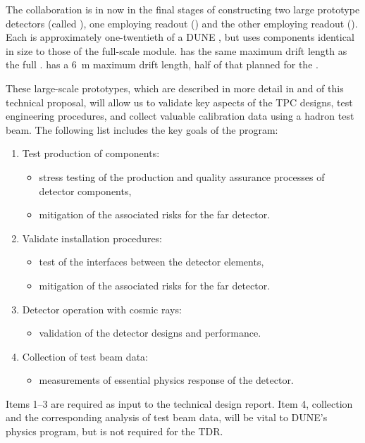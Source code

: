 The collaboration is in now in the final stages of constructing two large prototype detectors (called ), one employing \single readout () and the other employing \dual readout (). Each is approximately one-twentieth of a DUNE , but uses components identical in size to those of the full-scale module.  has the same \spmaxdrift maximum drift length as the full .  has a \SI{6}{m} maximum drift length, half of that planned for the . 

These large-scale prototypes, which are described in more detail in 
\voltitlespfd and \voltitledpfd %
of this technical proposal, will allow us to validate key aspects of the TPC designs, test engineering procedures, and collect valuable calibration data using a hadron test beam. The following list includes the key goals of the  program:
\begin{enumerate}
\item Test production of components:
\begin{itemize}
\item stress testing of the production and quality
assurance processes of detector components,
\item mitigation of the associated risks for the far detector.
\end{itemize}
\item Validate installation procedures:
\begin{itemize}
\item test of the interfaces between the detector elements,
\item mitigation of the associated risks for the far detector.
\end{itemize}
\item Detector operation with cosmic rays:
\begin{itemize}
\item validation of the detector designs and
performance.
\end{itemize}
\item Collection of test beam data:
\begin{itemize}
\item measurements of essential physics response of the detector.
\end{itemize}
\end{enumerate}

Items \numrange{1}{3} are required as input to the technical design report. Item 4, collection and the corresponding analysis of test beam data, will be vital to DUNE's physics program, but is not required for the TDR.

